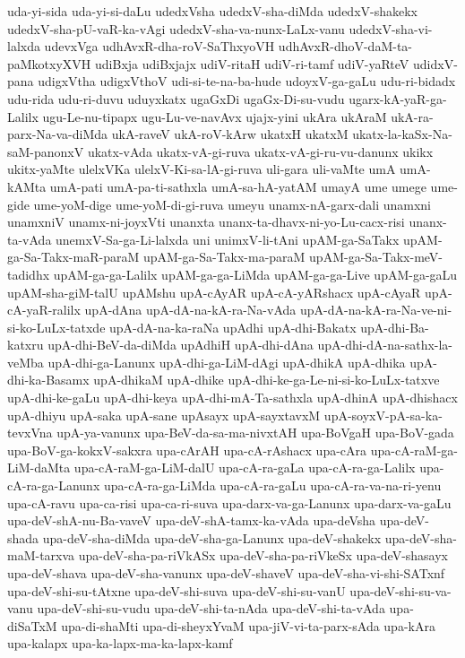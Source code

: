 {uda-yi-sida
uda-yi-si-daLu
udedxVsha
udedxV-sha-diMda
udedxV-shakekx
udedxV-sha-pU-vaR-ka-vAgi
udedxV-sha-va-nunx-LaLx-vanu
udedxV-sha-vi-lalxda
udevxVga
udhAvxR-dha-roV-SaThxyoVH
udhAvxR-dhoV-daM-ta-paMkotxyXVH
udiBxja
udiBxjajx
udiV-ritaH
udiV-ri-tamf
udiV-yaRteV
udidxV-pana
udigxVtha
udigxVthoV
udi-si-te-na-ba-hude
udoyxV-ga-gaLu
udu-ri-bidadx
udu-rida
udu-ri-duvu
uduyxkatx
ugaGxDi
ugaGx-Di-su-vudu
ugarx-kA-yaR-ga-Lalilx
ugu-Le-nu-tipapx
ugu-Lu-ve-navAvx
ujajx-yini
ukAra
ukAraM
ukA-ra-parx-Na-va-diMda
ukA-raveV
ukA-roV-kArw
ukatxH
ukatxM
ukatx-la-kaSx-Na-saM-panonxV
ukatx-vAda
ukatx-vA-gi-ruva
ukatx-vA-gi-ru-vu-danunx
ukikx
ukitx-yaMte
ulelxVKa
ulelxV-Ki-sa-lA-gi-ruva
uli-gara
uli-vaMte
umA
umA-kAMta
umA-pati
umA-pa-ti-sathxla
umA-sa-hA-yatAM
umayA
ume
umege
ume-gide
ume-yoM-dige
ume-yoM-di-gi-ruva
umeyu
unamx-nA-garx-dali
unamxni
unamxniV
unamx-ni-joyxVti
unanxta
unanx-ta-dhavx-ni-yo-Lu-cacx-risi
unanx-ta-vAda
unemxV-Sa-ga-Li-lalxda
uni
unimxV-li-tAni
upAM-ga-SaTakx
upAM-ga-Sa-Takx-maR-paraM
upAM-ga-Sa-Takx-ma-paraM
upAM-ga-Sa-Takx-meV-tadidhx
upAM-ga-ga-Lalilx
upAM-ga-ga-LiMda
upAM-ga-ga-Live
upAM-ga-gaLu
upAM-sha-giM-talU
upAMshu
upA-cAyAR
upA-cA-yARshacx
upA-cAyaR
upA-cA-yaR-ralilx
upA-dAna
upA-dA-na-kA-ra-Na-vAda
upA-dA-na-kA-ra-Na-ve-ni-si-ko-LuLx-tatxde
upA-dA-na-ka-raNa
upAdhi
upA-dhi-Bakatx
upA-dhi-Ba-katxru
upA-dhi-BeV-da-diMda
upAdhiH
upA-dhi-dAna
upA-dhi-dA-na-sathx-la-veMba
upA-dhi-ga-Lanunx
upA-dhi-ga-LiM-dAgi
upA-dhikA
upA-dhika
upA-dhi-ka-Basamx
upA-dhikaM
upA-dhike
upA-dhi-ke-ga-Le-ni-si-ko-LuLx-tatxve
upA-dhi-ke-gaLu
upA-dhi-keya
upA-dhi-mA-Ta-sathxla
upA-dhinA
upA-dhishacx
upA-dhiyu
upA-saka
upA-sane
upAsayx
upA-sayxtavxM
upA-soyxV-pA-sa-ka-tevxVna
upA-ya-vanunx
upa-BeV-da-sa-ma-nivxtAH
upa-BoVgaH
upa-BoV-gada
upa-BoV-ga-kokxV-sakxra
upa-cArAH
upa-cA-rAshacx
upa-cAra
upa-cA-raM-ga-LiM-daMta
upa-cA-raM-ga-LiM-dalU
upa-cA-ra-gaLa
upa-cA-ra-ga-Lalilx
upa-cA-ra-ga-Lanunx
upa-cA-ra-ga-LiMda
upa-cA-ra-gaLu
upa-cA-ra-va-na-ri-yenu
upa-cA-ravu
upa-ca-risi
upa-ca-ri-suva
upa-darx-va-ga-Lanunx
upa-darx-va-gaLu
upa-deV-shA-nu-Ba-vaveV
upa-deV-shA-tamx-ka-vAda
upa-deVsha
upa-deV-shada
upa-deV-sha-diMda
upa-deV-sha-ga-Lanunx
upa-deV-shakekx
upa-deV-sha-maM-tarxva
upa-deV-sha-pa-riVkASx
upa-deV-sha-pa-riVkeSx
upa-deV-shasayx
upa-deV-shava
upa-deV-sha-vanunx
upa-deV-shaveV
upa-deV-sha-vi-shi-SATxnf
upa-deV-shi-su-tAtxne
upa-deV-shi-suva
upa-deV-shi-su-vanU
upa-deV-shi-su-va-vanu
upa-deV-shi-su-vudu
upa-deV-shi-ta-nAda
upa-deV-shi-ta-vAda
upa-diSaTxM
upa-di-shaMti
upa-di-sheyxYvaM
upa-jiV-vi-ta-parx-sAda
upa-kAra
upa-kalapx
upa-ka-lapx-ma-ka-lapx-kamf
}
